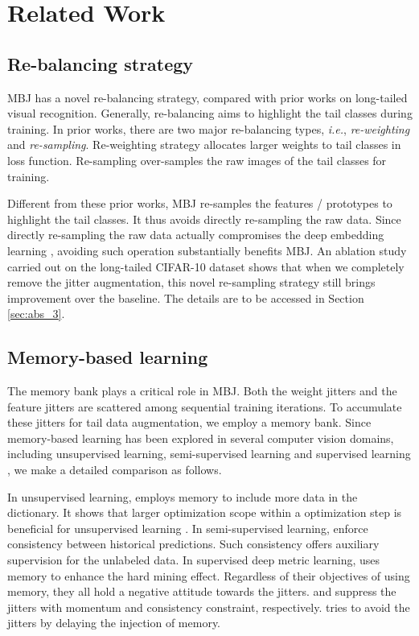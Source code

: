 \documentclass[final]{cvpr}
\begin{document}
\section{Related Work}\label{sec:relate}

\subsection{Re-balancing strategy}\label{sec:relate_balance}
MBJ has a novel re-balancing strategy, compared with prior works on long-tailed visual recognition. Generally, re-balancing aims to highlight the tail classes during training. In prior works,  there are two major re-balancing types, \emph{i.e.}, \textit{re-weighting}\cite{huang2016learning, wang2017learning,cb-focal} and \textit{re-sampling}\cite{shen2016relay,resample1,resample2,resample3}. Re-weighting strategy allocates larger weights to tail classes in loss function. Re-sampling over-samples the raw images of the tail classes for training. 

Different from these prior works, MBJ re-samples the features / prototypes to highlight the tail classes. It thus avoids directly re-sampling the raw data. Since directly re-sampling the raw data actually compromises the deep embedding learning \cite{BBN,decoupling}, avoiding such operation substantially benefits MBJ. An ablation study carried out on the long-tailed CIFAR-10 dataset shows that when we completely remove the jitter augmentation, this novel re-sampling strategy still brings \textbf{} improvement over the baseline. The details are to be accessed in Section \ref{sec:abs_3}. 

\subsection{Memory-based learning}
The memory bank plays a critical role in MBJ. Both the weight jitters and the feature jitters are scattered among sequential training iterations. To accumulate these jitters for tail data augmentation, we employ a memory bank. Since memory-based learning has been explored in several computer vision domains, including unsupervised learning, semi-supervised learning and supervised learning  \cite{moco,meanteacher,temporal,XBM,fewshot1,fewshot2}, we make a detailed comparison as follows.

In unsupervised learning, \cite{moco} employs memory to include more data in the dictionary. It shows that larger optimization scope within a optimization step is beneficial for unsupervised learning \cite{moco}. In semi-supervised learning, \cite{temporal,meanteacher} enforce consistency between historical predictions. Such consistency offers auxiliary supervision for the unlabeled data. In supervised deep metric learning, \cite{XBM} uses memory to enhance the hard mining effect. Regardless of their objectives of using memory, they all hold a negative attitude towards the jitters. \cite{moco} and \cite{temporal,meanteacher} suppress the jitters with momentum and consistency constraint, respectively. \cite{XBM} tries to avoid the jitters by delaying the injection of memory. 
\end{document}
